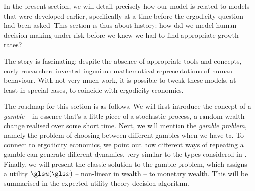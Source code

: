 In the present section, we will detail precisely how our model is related to models that were developed earlier, 
specifically at a time before the ergodicity question had been asked. This section is thus about history: how did we
model human decision making under risk before we knew we had to find appropriate growth rates?

The story is fascinating: despite the absence of appropriate tools and concepts, early researchers
invented ingenious mathematical representations of human behaviour. With not very much work, it is 
possible to tweak these models, at least in special cases, to coincide with ergodicity economics.

The roadmap for this section is as follows. We will first introduce the concept of a {\it gamble} -- in essence that's a 
little piece of a stochastic process, a random wealth change realised over some short time. Next, we will 
mention the {\it gamble problem}, namely the problem of choosing between different gambles when we have 
to. To connect to ergodicity economics, we point out how different ways of repeating a gamble 
can generate different dynamics, very similar to the types considered in .
Finally, we will present the classic solution to the gamble problem, which assigns a utility $\gu(\x)$ -- non-linear in wealth -- to
monetary wealth. This will be summarised in the expected-utility-theory decision algorithm.


